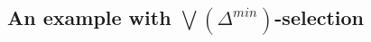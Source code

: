 \documentclass[]{article}
\newcommand{\TurnOne}[2]
    { {#1}\vdash_{\textbf{\sf 1}}  {#2}}
\newcommand{\TurnTwo}[2]
    { {#1}\vdash_{\textbf{\sf 2}}  {#2}}
\newcommand{\TurnThree}[2]
    { {#1}\vdash_{\textbf{\sf 3}}  {#2}}
\newcommand{\TurnFour}[2]
    { {#1}\vdash_{\textbf{\sf 4}}  {#2}}
\newcommand{\TurnSix}[2]
    { {#1}\vdash_{\textbf{\sf 6}}  {#2}}
\newcommand{\TurnSeven}[2]
    { {#1}\vdash_{\textbf{\sf 7}}  {#2}}
\newcommand{\TurnMarkedFiveMA}[2]
    { {#1}\vdash_{\textbf{\sf 5\XBox MA}}  {#2}}
\newcommand{\TurnMarkedEightMA}[2]
    { {#1}\vdash_{\textbf{\sf 8\XBox MA}}  {#2}}
\newcommand{\TurnNine}[2]
    { {#1}\vdash_{\textbf{\sf 9}}  {#2}}
\begin{document}
%
%
%
%
%

\subsection{An example with $\bigvee(\Delta^{min})$-selection}
\end{document}
